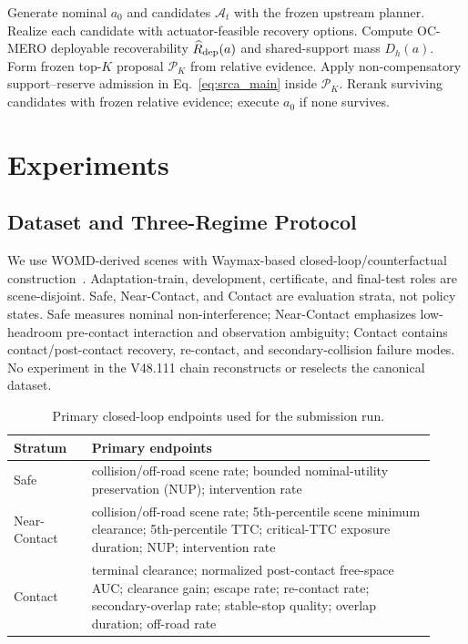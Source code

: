 \documentclass[conference]{IEEEtran}
\newcommand{\cA}{\mathcal{A}}
\newcommand{\cP}{\mathcal{P}}
\begin{document}
\begin{algorithm}[t]
\caption{OC-RAP runtime decision (CNRO remains offline)}
\label{alg:ocrap}
\begin{algorithmic}[1]
\STATE Generate nominal $a_0$ and candidates $\cA_t$ with the frozen upstream planner.
\STATE Realize each candidate with actuator-feasible recovery options.
\STATE Compute OC-MERO deployable recoverability $\widehat R_{\rm dep}(a)$ and shared-support mass $D_h(a)$.
\STATE Form frozen top-$K$ proposal $\cP_K$ from relative evidence.
\STATE Apply non-compensatory support--reserve admission in Eq.~\eqref{eq:srca_main} inside $\cP_K$.
\STATE Rerank surviving candidates with frozen relative evidence; execute $a_0$ if none survives.
\end{algorithmic}
\end{algorithm}

\section{Experiments}
\label{sec:experiments}

\subsection{Dataset and Three-Regime Protocol}
We use WOMD-derived scenes with Waymax-based closed-loop/counterfactual construction~\cite{ettinger2021large,gulino2023waymax}. Adaptation-train, development, certificate, and final-test roles are scene-disjoint. Safe, Near-Contact, and Contact are evaluation strata, not policy states. Safe measures nominal non-interference; Near-Contact emphasizes low-headroom pre-contact interaction and observation ambiguity; Contact contains contact/post-contact recovery, re-contact, and secondary-collision failure modes. No experiment in the V48.111 chain reconstructs or reselects the canonical dataset.

\begin{table}[t]
\centering
\caption{Primary closed-loop endpoints used for the submission run.}
\label{tab:regime_metrics}
\begin{tabular}{p{0.17\linewidth}p{0.75\linewidth}}
\toprule
Stratum & Primary endpoints \\
\midrule
Safe & collision/off-road scene rate; bounded nominal-utility preservation (NUP); intervention rate \\
Near-Contact & collision/off-road scene rate; 5th-percentile scene minimum clearance; 5th-percentile TTC; critical-TTC exposure duration; NUP; intervention rate \\
Contact & terminal clearance; normalized post-contact free-space AUC; clearance gain; escape rate; re-contact rate; secondary-overlap rate; stable-stop quality; overlap duration; off-road rate \\
\bottomrule
\end{tabular}
\end{table}
\end{document}
